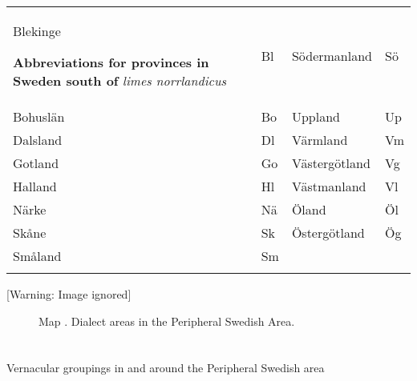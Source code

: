 \begin{tabular}{llll}
\lsptoprule
Blekinge

\begin{minipage}{5.8752in}
\textbf{Abbreviations for provinces in Sweden south of}\textit{ limes norrlandicus}

\end{minipage} & Bl & Södermanland & Sö\\
Bohuslän & Bo & Uppland & Up\\
Dalsland & Dl & Värmland & Vm\\
Gotland & Go & Västergötland & Vg\\
Halland & Hl & Västmanland & Vl\\
Närke & Nä & Öland & Öl\\
Skåne & Sk & Östergötland & Ög\\
Småland & Sm &  & \\
\lspbottomrule
\end{tabular}

  [Warning: Image ignored] %
 

\begin{stylecaption}

\end{stylecaption}

\begin{figure}[h]

\begin{minipage}{6.6547in}

\begin{stylecaption}
Map . Dialect areas in the Peripheral Swedish Area.

\end{stylecaption}

\end{minipage}

\end{figure}

\section{}

Vernacular groupings in and around the Peripheral Swedish area

